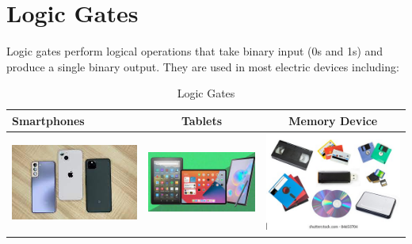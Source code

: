\documentclass{article}
\begin{document}
	\section{Logic Gates} Logic gates perform logical operations that take binary input (0s and 1s) and produce a single binary output. They are used in most electric devices including:
	
	\begin{table}[h!]
		\begin{center}
			\caption{Logic Gates}
			\label{tab:table1}
			\begin{tabular}{|l|c|c|}
				\hline
				Smartphones
				&
				Tablets
				&
				Memory Device
				\\
				\hline
				\includegraphics[width=0.2\linewidth]{"smartphones"}
				&
				\includegraphics[width=0.25\linewidth]{"tablets"}
				&
				\includegraphics[width=0.2\linewidth]{"memory devices"}
				\\
				\hline
				
			\end{tabular}
		\end{center}
	\end{table}
\end{document}
